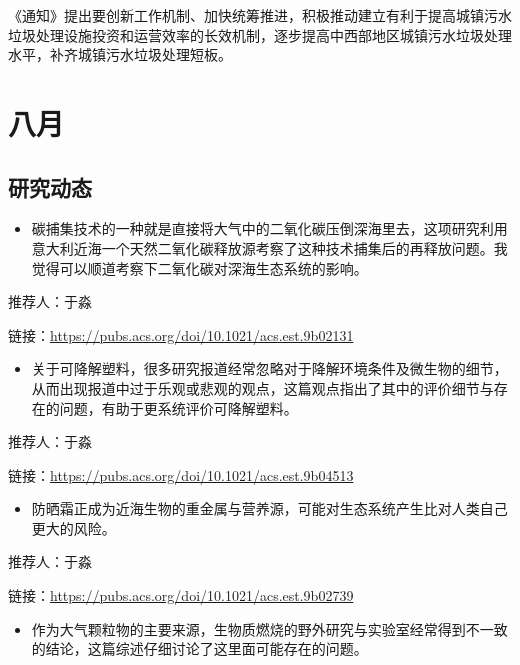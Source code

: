 \documentclass[
]{book}
\providecommand{\tightlist}{%
  \setlength{\itemsep}{0pt}\setlength{\parskip}{0pt}}
\begin{document}
《通知》提出要创新工作机制、加快统筹推进，积极推动建立有利于提高城镇污水垃圾处理设施投资和运营效率的长效机制，逐步提高中西部地区城镇污水垃圾处理水平，补齐城镇污水垃圾处理短板。

\hypertarget{ux516bux6708-1}{%
\section*{八月}\label{ux516bux6708-1}}

\hypertarget{ux7814ux7a76ux52a8ux6001-21}{%
\subsection*{研究动态}\label{ux7814ux7a76ux52a8ux6001-21}}

\begin{itemize}
\tightlist
\item
  碳捕集技术的一种就是直接将大气中的二氧化碳压倒深海里去，这项研究利用意大利近海一个天然二氧化碳释放源考察了这种技术捕集后的再释放问题。我觉得可以顺道考察下二氧化碳对深海生态系统的影响。
\end{itemize}

推荐人：于淼

链接：\url{https://pubs.acs.org/doi/10.1021/acs.est.9b02131}

\begin{itemize}
\tightlist
\item
  关于可降解塑料，很多研究报道经常忽略对于降解环境条件及微生物的细节，从而出现报道中过于乐观或悲观的观点，这篇观点指出了其中的评价细节与存在的问题，有助于更系统评价可降解塑料。
\end{itemize}

推荐人：于淼

链接：\url{https://pubs.acs.org/doi/10.1021/acs.est.9b04513}

\begin{itemize}
\tightlist
\item
  防晒霜正成为近海生物的重金属与营养源，可能对生态系统产生比对人类自己更大的风险。
\end{itemize}

推荐人：于淼

链接：\url{https://pubs.acs.org/doi/10.1021/acs.est.9b02739}

\begin{itemize}
\tightlist
\item
  作为大气颗粒物的主要来源，生物质燃烧的野外研究与实验室经常得到不一致的结论，这篇综述仔细讨论了这里面可能存在的问题。
\end{itemize}
\end{document}
